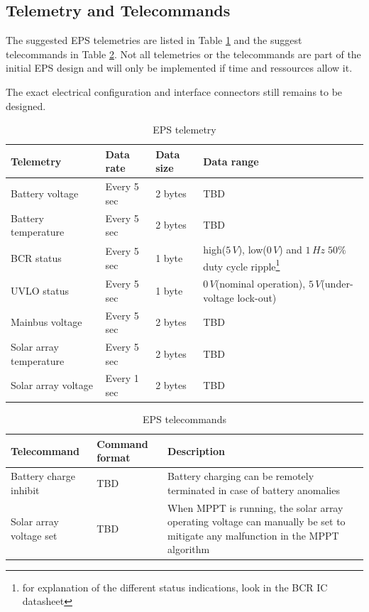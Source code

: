 \subsection{Telemetry and Telecommands}
The suggested \ac{EPS} telemetries are listed in Table \ref{tab:Telemetry} and the suggest telecommands in Table \ref{tab:Telecommands}. Not all telemetries or the telecommands are part of the initial \ac{EPS} design and will only be implemented if time and ressources allow it.

The exact electrical configuration and interface connectors still remains to be designed.
%
\begin{table}[H]
\centering
\caption{\ac{EPS} telemetry}
\label{tab:Telemetry}
\begin{tabular}{|p{}p{}p{}p{}|}
\hline
\textbf{Telemetry} & \textbf{Data rate} & \textbf{Data size} & \textbf{Data range}\\
\hline
Battery voltage & Every 5 sec & 2 bytes & \ac{TBD}\\
\hline
Battery temperature & Every 5 sec & 2 bytes & \ac{TBD}\\
\hline
BCR status & Every 5 sec & 1 byte & high($5\,V$), low($0\,V$) and $1\,Hz\;50\%$ duty cycle ripple\footnote{for explanation of the different status indications, look in the \ac{BCR} \ac{IC} datasheet}\\
\hline
\ac{UVLO} status & Every 5 sec & 1 byte &  $0\,V$(nominal operation), $5\,V$(under-voltage lock-out)\\
\hline
Mainbus voltage & Every 5 sec & 2 bytes & \ac{TBD}\\
\hline
Solar array temperature & Every 5 sec & 2 bytes & \ac{TBD}\\
\hline
Solar array voltage & Every 1 sec & 2 bytes & \ac{TBD}\\
\hline
\end{tabular}
\end{table}
%
\begin{table}[H]
\centering
\caption{\ac{EPS} telecommands}
\label{tab:Telecommands}
\begin{tabular}{|p{}p{}p{}|}
\hline
\textbf{Telecommand} & \textbf{Command format} & \textbf{Description}\\
\hline
Battery charge inhibit & \ac{TBD} & Battery charging can be remotely terminated in case of battery anomalies\\
\hline
Solar array voltage set & \ac{TBD} & When \ac{MPPT} is running, the solar array operating voltage can manually be set to mitigate any malfunction in the \ac{MPPT} algorithm\\
\hline
\end{tabular}
\end{table}